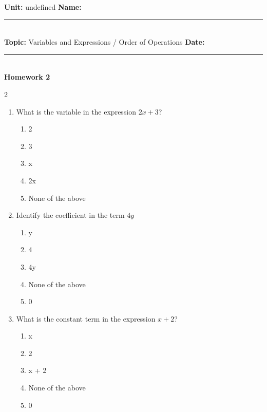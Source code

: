 \documentclass[10pt]{article}
\begin{document}
\enlargethispage{2.5cm}

\begin{tcolorbox}[colback=mainblue!5, colframe=mainblue, sharp corners, boxrule=0.5pt]
    \small \textbf{Unit:} undefined \hfill \textbf{Name:} \rule{3cm}{0.4pt} \\
    \small \textbf{Topic:} Variables and Expressions / Order of Operations \hfill \textbf{Date:} \rule{2cm}{0.4pt} \\
    \centering \textbf{\large Homework 2}
\end{tcolorbox}

\vspace{0.2cm}

\begin{multicols}{2}
\begin{enumerate}[label=\textbf{Q\arabic*.}, leftmargin=*, itemsep=6pt, parsep=0pt]

  \item \small What is the variable in the expression $2x + 3$?
  \begin{enumerate}[label=(\Alph*), leftmargin=0.6cm, nosep, itemsep=2pt]
    \item 2
    \item 3
    \item x
    \item 2x
    \item None of the above
  \end{enumerate}

  \item \small Identify the coefficient in the term $4y$
  \begin{enumerate}[label=(\Alph*), leftmargin=0.6cm, nosep, itemsep=2pt]
    \item y
    \item 4
    \item 4y
    \item None of the above
    \item 0
  \end{enumerate}

  \item \small What is the constant term in the expression $x + 2$?
  \begin{enumerate}[label=(\Alph*), leftmargin=0.6cm, nosep, itemsep=2pt]
    \item x
    \item 2
    \item x + 2
    \item None of the above
    \item 0
  \end{enumerate}


\end{enumerate}
\end{multicols}
\end{document}
